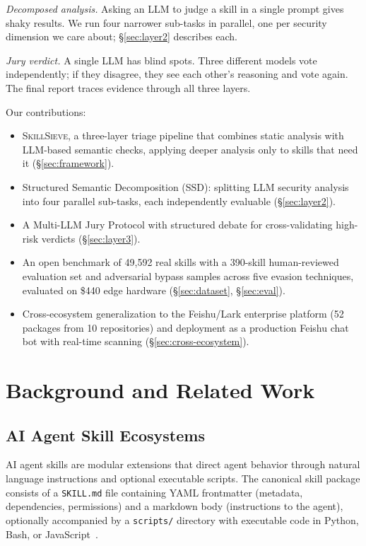 \documentclass[sigconf,nonacm]{acmart}
\begin{document}
\emph{Decomposed analysis.} Asking an LLM to judge a skill in a single prompt gives shaky results. We run four narrower sub-tasks in parallel, one per security dimension we care about; \S\ref{sec:layer2} describes each.

\emph{Jury verdict.} A single LLM has blind spots. Three different models vote independently; if they disagree, they see each other's reasoning and vote again. The final report traces evidence through all three layers.

Our contributions:
\begin{itemize}[topsep=0pt,partopsep=0pt,parsep=0pt,itemsep=2pt,leftmargin=1.2em]
    \item \textsc{SkillSieve}, a three-layer triage pipeline that combines static analysis with LLM-based semantic checks, applying deeper analysis only to skills that need it (\S\ref{sec:framework}).
    \item Structured Semantic Decomposition (SSD): splitting LLM security analysis into four parallel sub-tasks, each independently evaluable (\S\ref{sec:layer2}).
    \item A Multi-LLM Jury Protocol with structured debate for cross-validating high-risk verdicts (\S\ref{sec:layer3}).
    \item An open benchmark of 49,592 real skills with a 390-skill human-reviewed evaluation set and adversarial bypass samples across five evasion techniques, evaluated on \$440 edge hardware (\S\ref{sec:dataset}, \S\ref{sec:eval}).
    \item Cross-ecosystem generalization to the Feishu/Lark enterprise platform (52 packages from 10 repositories) and deployment as a production Feishu chat bot with real-time scanning (\S\ref{sec:cross-ecosystem}).
\end{itemize}

\section{Background and Related Work}
\label{sec:background}

\subsection{AI Agent Skill Ecosystems}

AI agent skills are modular extensions that direct agent behavior through natural language instructions and optional executable scripts. The canonical skill package consists of a \texttt{SKILL.md} file containing YAML frontmatter (metadata, dependencies, permissions) and a markdown body (instructions to the agent), optionally accompanied by a \texttt{scripts/} directory with executable code in Python, Bash, or JavaScript~\cite{clawhub2026format}.
\end{document}
